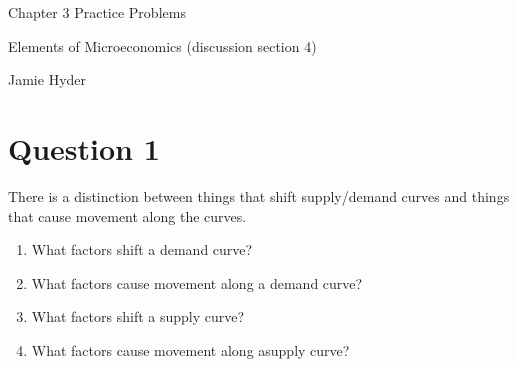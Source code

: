 \documentclass[12pt]{article}
\begin{document}
\begin{center}
\Large Chapter 3 Practice Problems

\medskip

\normalsize Elements of Microeconomics (discussion section 4)

\medskip

\small Jamie Hyder
\end{center}

\medskip

\section*{Question 1}
There is a distinction between things that shift supply/demand curves and things that cause movement along the curves.
\begin{enumerate}
    \item What factors shift a demand curve?
    \item What factors cause movement along a demand curve?
    \item What factors shift a supply curve?
    \item What factors cause movement along asupply curve?
\end{enumerate}

\medskip
\end{document}
